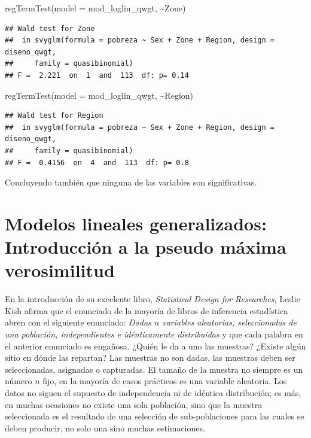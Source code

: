\documentclass[
  12pt,
]{book}
\newenvironment{Shaded}{\begin{snugshade}}{\end{snugshade}}
\newcommand{\AttributeTok}[1]{\textcolor[rgb]{0.77,0.63,0.00}{#1}}
\newcommand{\FunctionTok}[1]{\textcolor[rgb]{0.00,0.00,0.00}{#1}}
\newcommand{\NormalTok}[1]{#1}
\newcommand{\SpecialCharTok}[1]{\textcolor[rgb]{0.00,0.00,0.00}{#1}}
\begin{document}
\begin{Shaded}
\begin{Highlighting}[]
\FunctionTok{regTermTest}\NormalTok{(}\AttributeTok{model =}\NormalTok{ mod\_loglin\_qwgt, }\SpecialCharTok{\textasciitilde{}}\NormalTok{Zone)}
\end{Highlighting}
\end{Shaded}

\begin{verbatim}
## Wald test for Zone
##  in svyglm(formula = pobreza ~ Sex + Zone + Region, design = diseno_qwgt, 
##     family = quasibinomial)
## F =  2.221  on  1  and  113  df: p= 0.14
\end{verbatim}

\begin{Shaded}
\begin{Highlighting}[]
\FunctionTok{regTermTest}\NormalTok{(}\AttributeTok{model =}\NormalTok{ mod\_loglin\_qwgt, }\SpecialCharTok{\textasciitilde{}}\NormalTok{Region)}
\end{Highlighting}
\end{Shaded}

\begin{verbatim}
## Wald test for Region
##  in svyglm(formula = pobreza ~ Sex + Zone + Region, design = diseno_qwgt, 
##     family = quasibinomial)
## F =  0.4156  on  4  and  113  df: p= 0.8
\end{verbatim}

Concluyendo también que ninguna de las variables son significativas.

\hypertarget{modelos-lineales-generalizados-introducciuxf3n-a-la-pseudo-muxe1xima-verosimilitud}{%
\chapter{Modelos lineales generalizados: Introducción a la pseudo máxima verosimilitud}\label{modelos-lineales-generalizados-introducciuxf3n-a-la-pseudo-muxe1xima-verosimilitud}}

En la introducción de su excelente libro, \emph{Statistical Design for Researches}, Leslie Kish afirma que el enunciado de la mayoría de libros de inferencia estadística abren con el siguiente enunciado: \emph{Dadas \(n\) variables aleatorias, seleccionadas de una población, independientes e idénticamente distribuidas} y que cada palabra en el anterior enunciado es engañosa. ¿Quién le da a uno las muestras? ¿Existe algún sitio en dónde las repartan? Las muestras no son dadas, las muestras deben ser seleccionadas, asignadas o capturadas. El tamaño de la muestra no siempre es un número \(n\) fijo, en la mayoría de casos prácticos es una variable aleatoria. Los datos no siguen el supuesto de independencia ni de idéntica distribución; es más, en muchas ocasiones no existe una sola población, sino que la muestra seleccionada es el resultado de una selección de sub-poblaciones para las cuales se deben producir, no solo una sino muchas estimaciones.
\end{document}
